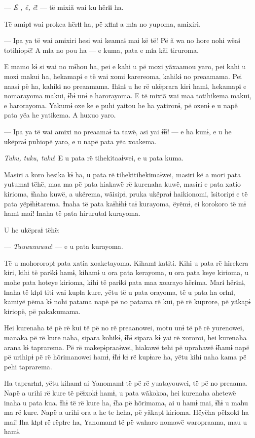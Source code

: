 --- \textit{Ẽ , ẽ, ẽ}! --- të mixiã wai ku hërɨɨ ha. 

Të amipɨ wai prokea hërɨɨ ha, pë xɨɨnɨ a mɨa no yupoma, amixiri. 

--- Ipa ya të wai amixiri hesi wai keamaɨ mai kë të! Pë ã wa no hore nohi
wëaɨ totihiopë! A mɨa no pou ha --- e kuma, pata e mɨa kãi tiruroma. 

E mamo kɨ si wai no mɨhou ha, pei e kahi u pë moxi yãxaamou yaro, pei
kahi u moxi makui ha, hekamapɨ e të wai xomi karereoma, kahikɨ no
preaamama. Pei naasi pë ha, kahikɨ no preaamama. Ɨhɨnɨ u he rë ukëprara
kiri hamɨ, hekamapɨ e nomarayoma makui, ɨ̃hɨ unɨ e harorayoma. E të mixiã
wai maa totihikema makui, e harorayoma. Yakumɨ oxe ke e puhi yaitou he
ha yatironɨ, pë oxenɨ e u napë pata yëa he yatikema. A huxuo yaro. 

--- Ipa ya të wai amixi no preaamaɨ ta tawë, asi yai ɨ̃ɨɨ! --- e ha kunɨ, e
u he ukëpraɨ puhiopë yaro, e u napë pata yëa xoakema. 

\textit{Tuku, tuku, tuku}! E u pata rë tihekitaaɨwei, e u pata kuma. 

Masiri a koro hesika kɨ ha, u pata rë tihekitihekimaɨwei, masiri kë a
mori pata yutumaɨ tëhë, maa ma pë pata hiakawë rë kurenaha kuwë, masiri
e pata xatio kirioma, ɨ̃naha kuwë, a ukërema, wãisipɨ, pruka ukëpraɨ
haikionomi, ĩsitoripɨ e të pata yëpɨhɨtarema. Ɨnaha të pata kaɨhɨhɨ taɨ
kurayoma, ëyëmɨ, ei korokoro të mɨ hamɨ mai! Ɨnaha të pata hirurutaɨ
kurayoma. 

U he ukëpraɨ tëhë: 

--- \textit{Tuuuuuuuuu}! --- e u pata kurayoma. 

Të u mohororopɨ pata xatia xoaketayoma. Kihamɨ katiti. Kihi u pata rë
hirekera kiri, kihi të parɨkɨ hamɨ, kihamɨ u ora pata kerayoma, u ora
pata keye kirioma, u mohe pata hoteye kirioma, kihi të parɨkɨ pata maa
xoarayo hërɨma. Marɨ hërɨnɨ, ɨnaha të kɨpɨ titi wai kupɨa kure, yëtu të
u pata orayoma, të u pata ha orɨnɨ, kamiyë pëma kɨ nohi patama napë pë
no patama rë kui, pë rë kuprore, pë yãkapɨ kiriopë, pë pakakumama. 

Hei kurenaha të pë rë kui të pë no rë preaanowei, motu unɨ të pë rë
yurenowei, manaka pë rë kure naha, sipara kohikɨ, ɨ̃hɨ sipara kɨ yai rë
xororoi, hei kurenaha arana kɨ taprarema. Pë rë makepɨpraaɨwei, hiakawë
tehi pë uprahawë ɨ̃hamɨ napë pë urihipɨ pë rë hõrimanowei hamɨ, ɨ̃hɨ kɨ rë
kupɨare ha, yëtu kihi naha kama pë pehi taprarema. 

Ha taprarɨnɨ, yëtu kihamɨ ai Yanomamɨ të pë rë yuatayouwei, të pë no
preaama. Napë a urihi rë kure të pëɨxokɨ hamɨ, u pata wãkokoa, hei
kurenaha ahetewë inaha u pata kua. Ɨhɨ të rë kure ha, ɨ̃ha pë hõrimama,
ai u hamɨ mai, ɨ̃hɨ u mahu ma rë kure. Napë a urihi ora a he te heha, pë
yãkapɨ kirioma. Hëyëha pëɨxokɨ ha mai! Ɨha kɨpɨ rë rëpɨre ha, Yanomamɨ
të pë waharo nomawë waropraama, mau u hamɨ. 


